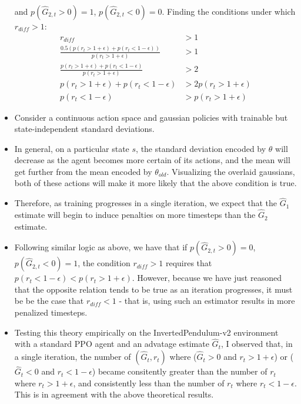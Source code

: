 \documentclass[a4paper]{article}
\begin{document}
\begin{itemize}
        and
        $p(\hat{G}_{2, t} > 0) = 1$, $p(\hat{G}_{2, t} < 0) = 0$. Finding the
        conditions under which $r_{diff} > 1$:
        \begin{align*}
            r_{diff} &>  1\\
            \frac{0.5(p(r_t > 1 + \epsilon) + p(r_t < 1 - \epsilon))}
                {p(r_t > 1 + \epsilon)}
            &> 1\\
            \frac{p(r_t > 1 + \epsilon) + p(r_t < 1 - \epsilon)}
                {p(r_t > 1 + \epsilon)}
            &> 2\\
            p(r_t > 1 + \epsilon) + p(r_t < 1 - \epsilon)
            &> 2p(r_t > 1 + \epsilon)\\
            p(r_t < 1 - \epsilon)
            &> p(r_t > 1 + \epsilon)
        \end{align*}
    \item Consider a continuous action space and gaussian
        policies with trainable but state-independent standard deviations.
    \item In general, on a particular state $s$, the standard deviation encoded
        by $\theta$ will decrease as the agent becomes more certain of its
        actions, and the mean will get further from the mean encoded by
        $\theta_{old}$. Visualizing the overlaid gaussians, both of these
        actions will make it more likely that the above condition is true.
    \item Therefore, as training progresses in a single iteration, we expect
        that the $\hat{G}_1$ estimate will begin to induce penalties on more
        timesteps than the $\hat{G}_2$ estimate.
    \item Following similar logic as above, we have that if
        $p(\hat{G}_{2, t} > 0) = 0$, $p(\hat{G}_{2, t} < 0) = 1$, the condition
        $r_{diff} > 1$ requires that $p(r_t < 1 - \epsilon) < p(r_t > 1 +
        \epsilon)$.  However, because we have just reasoned that the opposite
        relation tends to be true as an iteration progresses, it must be be the
        case that $r_{diff} < 1$ - that is, using such an estimator results in
        more penalized timesteps.
    \item Testing this theory empirically on the InvertedPendulum-v2
        environment with a standard PPO agent and an advatage estimate
        $\hat{G}_t$, I observed that, in a single
        iteration, the number of $(\hat{G}_t, r_t)$ where 
        ($\hat{G}_t > 0 $ and $r_t > 1 + \epsilon$)
        or
        ($\hat{G}_t < 0 $ and $r_t < 1 - \epsilon$) became consitently greater
        than the number of $r_t$ where $r_t > 1 + \epsilon$, and consistently
        less than the number of $r_t$ where $r_t < 1 - \epsilon$. This is in
        agreement with the above theoretical results.
\end{itemize}
\end{document}
